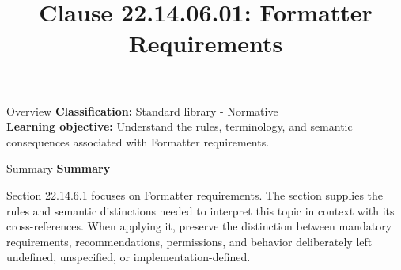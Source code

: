 \documentclass[10pt,letterpaper]{article}
\title{Clause 22.14.06.01: Formatter Requirements}
\author{}
\date{}
\begin{document}
\maketitle
\begin{CornellOverviewBox}{Overview}
\textbf{Classification:} Standard library - Normative\\[2pt]
\textbf{Learning objective:} Understand the rules, terminology, and semantic consequences associated with Formatter requirements.
\end{CornellOverviewBox}\begin{CornellSummaryBox}{Summary}
{\sffamily\bfseries\color{Accent} Summary}\par\vspace{3pt}Section 22.14.6.1 focuses on Formatter requirements. The section supplies the rules and semantic distinctions needed to interpret this topic in context with its cross-references. When applying it, preserve the distinction between mandatory requirements, recommendations, permissions, and behavior deliberately left undefined, unspecified, or implementation-defined.
\end{CornellSummaryBox}
\end{document}
